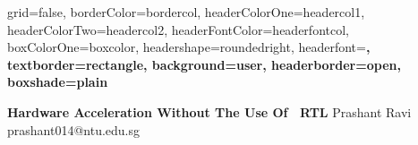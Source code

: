\documentclass[a0paper,portrait]{baposter}
\begin{document}


\begin{poster}{
	grid=false,
	borderColor=bordercol,
	headerColorOne=headercol1,
	headerColorTwo=headercol2,
	headerFontColor=headerfontcol,
	boxColorOne=boxcolor,
	headershape=roundedright,
	headerfont=\large\sf\bf,
	textborder=rectangle,
	background=user,
	headerborder=open,
  boxshade=plain
}
{
	\setlength\fboxsep{0pt}
	\setlength\fboxrule{0pt}
	
}
{\huge\sf\bf
Hardware Acceleration Without The Use Of ~RTL
}
{
	\vspace{0.3em} Prashant Ravi\\
	{\smaller prashant014@ntu.edu.sg}
}




\end{poster}
\end{document}
